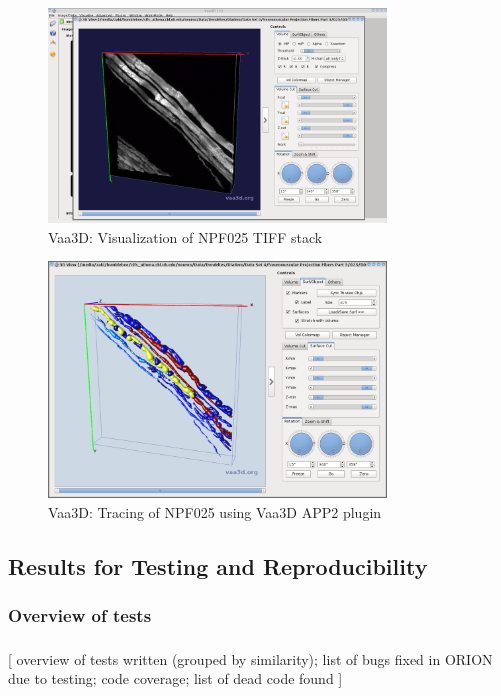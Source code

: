 \documentclass{beamer}
\begin{document}
\begin{frame}%
\begin{figure}[H]
\centering
\includegraphics[width=0.8\textwidth]{gfx/vaa3d_DIADEM-NPF-3-025_3D-view}
\caption{Vaa3D: Visualization of NPF025 TIFF stack}
\end{figure}
\end{frame}

\begin{frame}%
\begin{figure}[H]
\centering
\includegraphics[width=0.8\textwidth]{gfx/vaa3d_DIADEM-NPF-3-025_APP2-tracing-3D-view}
\caption{Vaa3D: Tracing of NPF025 using Vaa3D APP2 plugin}
\end{figure}
\end{frame}

\subsection{Results for Testing and Reproducibility}

\subsubsection{Overview of tests}
\begin{frame}\frametitle{\subsubsecname}
	[
		overview of tests written (grouped by similarity);
		list of bugs fixed in ORION due to testing;
		code coverage; list of dead code found
	]
\end{frame}
\end{document}
